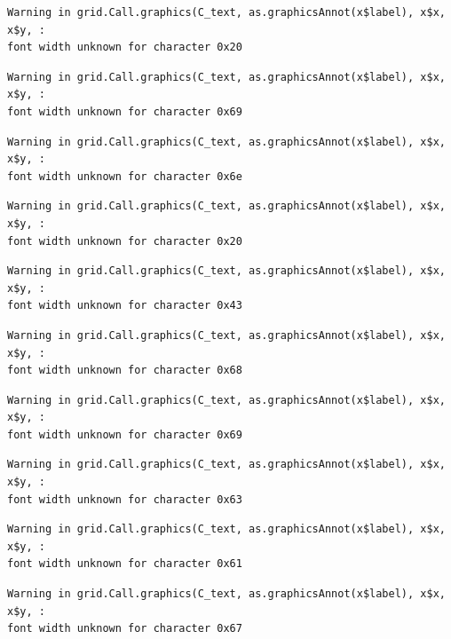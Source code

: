 \documentclass[
  letterpaper,
  DIV=11,
  numbers=noendperiod]{scrreprt}
\begin{document}
\begin{verbatim}
Warning in grid.Call.graphics(C_text, as.graphicsAnnot(x$label), x$x, x$y, :
font width unknown for character 0x20
\end{verbatim}

\begin{verbatim}
Warning in grid.Call.graphics(C_text, as.graphicsAnnot(x$label), x$x, x$y, :
font width unknown for character 0x69
\end{verbatim}

\begin{verbatim}
Warning in grid.Call.graphics(C_text, as.graphicsAnnot(x$label), x$x, x$y, :
font width unknown for character 0x6e
\end{verbatim}

\begin{verbatim}
Warning in grid.Call.graphics(C_text, as.graphicsAnnot(x$label), x$x, x$y, :
font width unknown for character 0x20
\end{verbatim}

\begin{verbatim}
Warning in grid.Call.graphics(C_text, as.graphicsAnnot(x$label), x$x, x$y, :
font width unknown for character 0x43
\end{verbatim}

\begin{verbatim}
Warning in grid.Call.graphics(C_text, as.graphicsAnnot(x$label), x$x, x$y, :
font width unknown for character 0x68
\end{verbatim}

\begin{verbatim}
Warning in grid.Call.graphics(C_text, as.graphicsAnnot(x$label), x$x, x$y, :
font width unknown for character 0x69
\end{verbatim}

\begin{verbatim}
Warning in grid.Call.graphics(C_text, as.graphicsAnnot(x$label), x$x, x$y, :
font width unknown for character 0x63
\end{verbatim}

\begin{verbatim}
Warning in grid.Call.graphics(C_text, as.graphicsAnnot(x$label), x$x, x$y, :
font width unknown for character 0x61
\end{verbatim}

\begin{verbatim}
Warning in grid.Call.graphics(C_text, as.graphicsAnnot(x$label), x$x, x$y, :
font width unknown for character 0x67
\end{verbatim}
\end{document}
